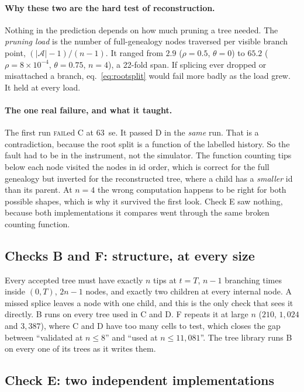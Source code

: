 \documentclass[11pt]{article}
\newcommand{\turn}{\theta}       %
\newcommand{\capt}{\rho}         %
\begin{document}
\paragraph{Why these two are the hard test of reconstruction.} Nothing in the prediction depends on
how much pruning a tree needed. The \emph{pruning load} is the number of full-genealogy nodes
traversed per visible branch point, $(|\mathcal{A}|-1)/(n-1)$. It ranged from $2.9$ ($\capt=0.5$,
$\turn=0$) to $65.2$ ($\capt=8\times10^{-4}$, $\turn=0.75$, $n=4$), a 22-fold span. If splicing ever
dropped or misattached a branch, eq.~\eqref{eq:rootsplit} would fail more badly as the load grew.
It held at every load.

\paragraph{The one real failure, and what it taught.} The first run \textsc{fail}ed C at $63$~se.
It passed D in the \emph{same} run. That is a contradiction, because the root split is a function
of the labelled history. So the fault had to be in the instrument, not the simulator. The function
counting tips below each node visited the nodes in id order, which is correct for the full
genealogy but inverted for the reconstructed tree, where a child has a \emph{smaller} id than its
parent. At $n=4$ the wrong computation happens to be right for both possible shapes, which is why
it survived the first look. Check E saw nothing, because both implementations it compares went
through the same broken counting function.

\subsection{Checks B and F: structure, at every size}

Every accepted tree must have exactly $n$ tips at $t=T$, $n-1$ branching times inside $(0,T)$,
$2n-1$ nodes, and exactly two children at every internal node. A missed splice leaves a node with
one child, and this is the only check that sees it directly. B runs on every tree used in C and D.
F repeats it at large $n$ ($210$, $1{,}024$ and $3{,}387$), where C and D have too many cells to
test, which closes the gap between ``validated at $n\le8$'' and ``used at $n\le11{,}081$''. The tree
library runs B on every one of its trees as it writes them.

\subsection{Check E: two independent implementations}
\end{document}
